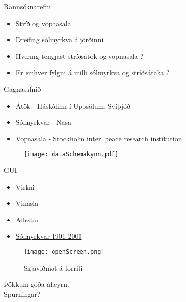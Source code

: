 \documentclass{rubeamer}
\begin{document}
\rutitleframe{}


\begin{frame}{Rannsóknarefni}
	\begin{itemize}
		\item Stríð og vopnasala 
		\item Dreifing sólmyrkva á jörðinni
		\item Hvernig tengjast stríðsátök og vopnasala ?
		\item Er einhver fylgni á milli sólmyrkva og stríðsátaka ?
		
	\end{itemize}
\end{frame}

\begin{frame}{Gagnasafnið}
	\vspace{2em}
	\begin{itemize}
		\item Átök - Háskólinn í Uppsölum, Svíþjóð \cite{conflict}
		\item Sólmyrkvar - Nasa \cite{Eclipse}
		\item Vopnasala - Stockholm inter. peace research institution \cite{weapon}
	\end{itemize}
	
	\begin{figure}
		\centering
		\texttt{[image: dataSchemakynn.pdf]}
	\end{figure}
\end{frame}

\begin{frame}{GUI}
	\begin{itemize}
		\item Virkni \cite{qt4} \cite{basemap}
		\item Vinnsla \cite{Qdarkstyle}
		\item Aflestur
		\item \href{file:///C:/haukur/skoli/5.onn/gagnavinnsla/Gagnavinnsla.git/trunk/lokaverkefni/kynning/graphics/SpinningGlobe.gif}{Sólmyrkvar 1901-2000} \cite{moviepy}
	\end{itemize}
	\begin{figure}
		\centering
		\texttt{[image: openScreen.png]}
		\caption*{Skjáviðmót á forriti}
	\end{figure}
\end{frame}

	
\begin{frame}
	\centering
	Þökkum góða áheyrn. \\
	Spurningar?\\
\end{frame}

\bibframe
\end{document}
